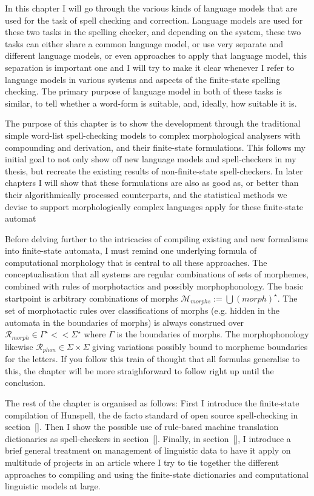 \documentclass[officiallayout,draft]{unihelcompling}
\begin{document}
In this chapter I will go through the various kinds of language models that are
used for the task of spell checking and correction. Language models are used
for these two tasks in the spelling checker, and depending on the system,
these two tasks can either share a common language model, or use very
separate and different language models, or even approaches to apply that
language model, this separation is important one and I will try to make it
clear whenever I refer to language models in various systems and aspects of
the finite-state spelling checking. The primary purpose of language model in
both of these tasks is similar, to tell whether a word-form is suitable, and,
ideally, how suitable it is.

The purpose of this chapter is to show the development through the traditional
simple word-list spell-checking models to complex morphological analysers with
compounding and derivation, and their finite-state formulations. This follows
my initial goal to not only show off new language models and spell-checkers
in my thesis, but recreate the existing results of non-finite-state 
spell-checkers. In later chapters I will show that these formulations are
also as good as, or better than their algorithmically processed counterparts,
and the statistical methods we devise to support morphologically complex
languages apply for these finite-state automat 

Before delving further to the intricacies of compiling existing and new
formalisms into finite-state automata, I must remind one underlying formula
of computational morphology that is central to all these approaches. The
conceptualisation that all systems are regular combinations of sets of
morphemes, combined with rules of morphotactics and possibly morphophonology.
The basic startpoint is arbitrary combinations of morphs $\mathcal{M}_{morphs}
:= \bigcup ({morph})^\star$. The set of morphotactic rules over classifications
of morphs (e.g. hidden in the automata in the boundaries of morphs) is always
construed over $\mathcal{R}_{morph} \in \Gamma^\star << \Sigma^\star$ where
$\Gamma$ is the boundaries of morphs. The morphophonology likewise 
$\mathcal{R}_{phon} \in \Sigma \times \Sigma$ giving variations possibly bound
to morpheme boundaries for the letters. If you follow this train of thought
that all formulas generalise to this, the chapter will be more straighforward
to follow right up until the conclusion.

The rest of the chapter is organised as follows: First I introduce the
finite-state compilation of Hunspell, the de facto standard of open source
spell-checking in section~\ref{}.  Then I show the possible use of rule-based
machine translation dictionaries as spell-checkers in section~\ref{}.  Finally,
in section~\ref{}, I introduce a brief general treatment on management of
linguistic data to have it apply on multitude of projects in an article where I
try to tie together the different approaches to compiling and using the
finite-state dictionaries and computational linguistic models at large.
\end{document}
